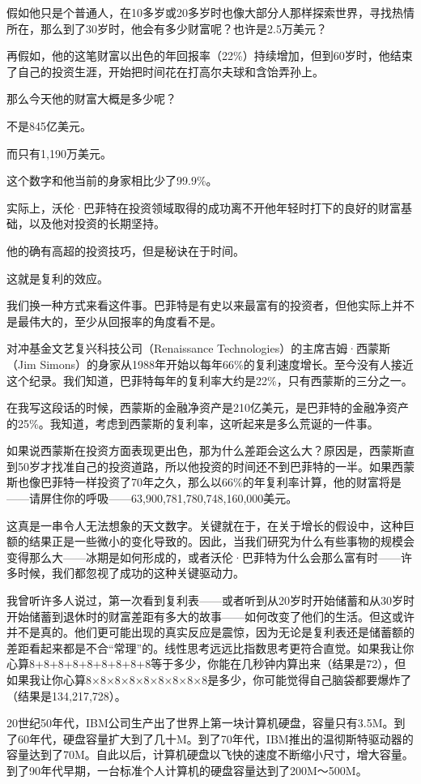 假如他只是个普通人，在10多岁或20多岁时也像大部分人那样探索世界，寻找热情所在，那么到了30岁时，他会有多少财富呢？也许是2.5万美元？

再假如，他的这笔财富以出色的年回报率（22\%）持续增加，但到60岁时，他结束了自己的投资生涯，开始把时间花在打高尔夫球和含饴弄孙上。

那么今天他的财富大概是多少呢？

不是845亿美元。

而只有1,190万美元。

这个数字和他当前的身家相比少了99.9\%。

实际上，沃伦·巴菲特在投资领域取得的成功离不开他年轻时打下的良好的财富基础，以及他对投资的长期坚持。

他的确有高超的投资技巧，但是秘诀在于时间。

这就是复利的效应。

我们换一种方式来看这件事。巴菲特是有史以来最富有的投资者，但他实际上并不是最伟大的，至少从回报率的角度看不是。

对冲基金文艺复兴科技公司（Renaissance Technologies）的主席吉姆·西蒙斯（Jim Simons）的身家从1988年开始以每年66\%的复利速度增长。至今没有人接近这个纪录。我们知道，巴菲特每年的复利率大约是22\%，只有西蒙斯的三分之一。

在我写这段话的时候，西蒙斯的金融净资产是210亿美元，是巴菲特的金融净资产的25\%。我知道，考虑到西蒙斯的复利率，这听起来是多么荒诞的一件事。

如果说西蒙斯在投资方面表现更出色，那为什么差距会这么大？原因是，西蒙斯直到50岁才找准自己的投资道路，所以他投资的时间还不到巴菲特的一半。如果西蒙斯也像巴菲特一样投资了70年之久，那么以66\%的年复利率计算，他的财富将是——请屏住你的呼吸——63,900,781,780,748,160,000美元。

这真是一串令人无法想象的天文数字。关键就在于，在关于增长的假设中，这种巨额的结果正是一些微小的变化导致的。因此，当我们研究为什么有些事物的规模会变得那么大——冰期是如何形成的，或者沃伦·巴菲特为什么会那么富有时——许多时候，我们都忽视了成功的这种关键驱动力。

我曾听许多人说过，第一次看到复利表——或者听到从20岁时开始储蓄和从30岁时开始储蓄到退休时的财富差距有多大的故事——如何改变了他们的生活。但这或许并不是真的。他们更可能出现的真实反应是震惊，因为无论是复利表还是储蓄额的差距看起来都是不合“常理”的。线性思考远远比指数思考更符合直觉。如果我让你心算8+8+8+8+8+8+8+8+8等于多少，你能在几秒钟内算出来（结果是72），但如果我让你心算8×8×8×8×8×8×8×8×8是多少，你可能觉得自己脑袋都要爆炸了（结果是134,217,728）。

20世纪50年代，IBM公司生产出了世界上第一块计算机硬盘，容量只有3.5M。到了60年代，硬盘容量扩大到了几十M。到了70年代，IBM推出的温彻斯特驱动器的容量达到了70M。自此以后，计算机硬盘以飞快的速度不断缩小尺寸，增大容量。到了90年代早期，一台标准个人计算机的硬盘容量达到了200M～500M。

